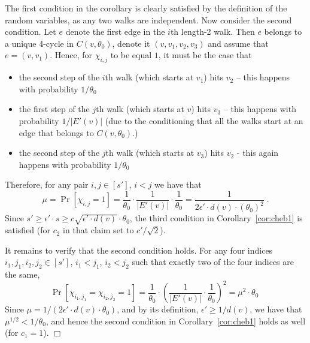 \documentclass{article}
\newcommand{\eps}{\epsilon}
\newenvironment{proof}{\smallskip\noindent{\bf Proof:}}%
        {\hspace*{\fill}$\Box$\par}
\newcommand{\commentt}[1]{ {}}
\newcommand{\talya}[1]{{} }
\begin{document}
\begin{proof}
The first condition in the corollary is clearly satisfied by the definition of the random variables, as any two walks are independent.
Now consider the second condition.
 Let $e$ denote the first edge in the $i$th length-2 walk. Then $e$ belongs to a unique 4-cycle in $C(v,\theta_0)$, denote it $(v,v_1, v_2, v_3)$ and assume that $e=(v,v_1)$. Hence, for $\chi_{i,j}$ to be equal $1$, it must be the case that
 \begin{itemize}
     \item the second step of the $i$th walk (which starts at $v_1$)  hits $v_2$ -- this happens with probability $1/\theta_0$
     \item the first step of the $j$th walk  (which starts at $v$) hits $v_3$ -- this happens with probability $1/|E'(v)|$ (due to the conditioning that all the walks start at an edge that belongs to $C(v,\theta_0)$.)
     \item the second step of the $j$th walk (which starts at $v_3$) hits $v_2$ - this again happens with probability $1/\theta_0$  
 \end{itemize}
Therefore, for any pair $i,j\in [s']$, $i<j$ we have that
\begin{equation}
\mu = \Pr[\chi_{i,j}=1] = \frac{1}{\theta_0}\cdot \frac{1}{|E'(v)|}\cdot \frac{1}{\theta_0}
     = \frac{1}{2\eps'\cdot d(v)\cdot (\theta_0)^2}\;.
\end{equation}
Since $s' \geq \eps' \cdot s \geq  c\sqrt{\eps' \cdot d(v)}\cdot \theta_0$, the third condition in Corollary~\ref{cor:cheb1}
is satisfied (for $c_2$ in that claim set to $c'/\sqrt{2}$).

It remains to verify that the second condition holds. For any four indices $i_1,j_1,i_2,j_2\in [s']$, $i_1 < j_1$, $i_2 < j_2$ such that exactly two of the four indices are the same, 
\begin{equation}
\Pr[\chi_{i_1,j_1}=\chi_{i_2,j_2} = 1] = \frac{1}{\theta_0}\cdot \left(\frac{1}{|E'(v)|}\cdot \frac{1}{\theta_0} \right)^2
 = \mu^2 \cdot \theta_0\;
\end{equation}
Since $\mu=1/(2\eps'\cdot d(v)\cdot \theta_0)$, 
and by its definition, $\eps' \geq 1/d(v)$, %
we have that $\mu^{1/2} < 1/\theta_0$, and hence the second condition in Corollary~\ref{cor:cheb1} holds as well (for $c_1 =1$).
\fi
\end{proof}
\end{document}
